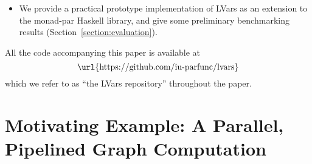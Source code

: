 \begin{itemize}

\item We provide a practical prototype implementation of LVars as an
  extension to the monad-par Haskell library,
  and give some preliminary benchmarking results
  (Section~\ref{section:evaluation}).

\end{itemize}
All the code accompanying this paper is available at
\[ \mbox{\url{https://github.com/iu-parfunc/lvars}} \]
which we refer to as ``the
LVars repository'' throughout the paper.

\section{Motivating Example: A Parallel, Pipelined Graph Computation}\label{section:motivation}


